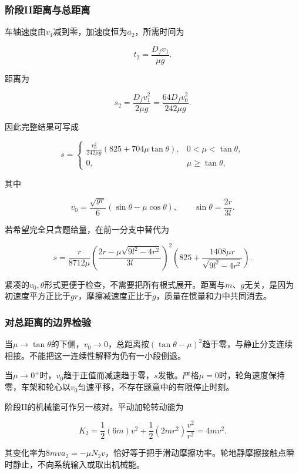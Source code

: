 \documentclass[12pt,a4paper,fontset=fandol]{ctexart}
\begin{document}
\subsubsection{阶段II距离与总距离}\label{ux9636ux6bb5iiux8dddux79bbux4e0eux603bux8dddux79bb}

车轴速度由\(v_1\)减到零，加速度恒为\(a_2\)，所需时间为

\[
t_2=\frac{D_fv_1}{\mu g}.
\]

距离为

\[
\boxed{s_2=\frac{D_fv_1^2}{2\mu g}
=\frac{64D_fv_0^2}{242\mu g}}.
\]

因此完整结果可写成

\[
\boxed{
s=
\begin{cases}
\displaystyle
\frac{v_0^2}{242\mu g}
\left(825+704\mu\tan\theta\right),
&0<\mu<\tan\theta,\\[4pt]
0,&\mu\ge\tan\theta,
\end{cases}}
\]

其中

\[
v_0=\frac{\sqrt{gr}}6(\sin\theta-\mu\cos\theta),
\qquad
\sin\theta=\frac{2r}{3l}.
\]

若希望完全只含题给量，在前一分支中替代为

\[
\boxed{
s=\frac{r}{8712\mu}
\left(\frac{2r-\mu\sqrt{9l^2-4r^2}}{3l}\right)^2
\left(825+\frac{1408\mu r}{\sqrt{9l^2-4r^2}}\right)}.
\]

紧凑的\(v_0,\theta\)形式更便于检查，不需要把所有根式展开。距离与\(m\)、\(g\)无关，是因为初速度平方正比于\(gr\)，摩擦减速度正比于\(g\)，质量在惯量和力中共同消去。

\subsubsection{对总距离的边界检验}\label{ux5bf9ux603bux8dddux79bbux7684ux8fb9ux754cux68c0ux9a8c}

当\(\mu\to\tan\theta\)的下侧，\(v_0\to0\)，总距离按\((\tan\theta-\mu)^2\)趋于零，与静止分支连续相接。不能把这一连续性解释为仍有一小段倒退。

当\(\mu\to0^+\)时，\(v_0\)趋于正值而减速趋于零，\(s\)发散。严格\(\mu=0\)时，轮角速度保持零，车架和轮心以\(v_0\)匀速平移，不存在题意中的有限停止时刻。

阶段II的机械能可作另一核对。平动加轮转动能为

\[
K_2=\frac12(6m)v^2+\frac12(2mr^2)\frac{v^2}{r^2}
=4mv^2.
\]

其变化率为\(8mva_2=-\mu N_2v\)，恰好等于把手滑动摩擦功率。轮地静摩擦接触点瞬时静止，不向系统输入或取出机械能。
\end{document}
